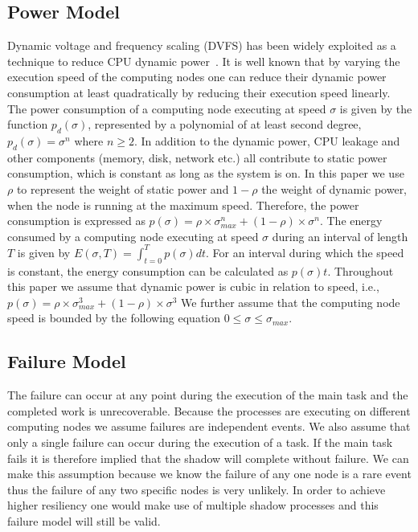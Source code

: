 \subsection{Power Model}
\label{power_model}
Dynamic voltage and frequency scaling
(DVFS) has
been widely exploited as a technique to reduce CPU dynamic power~\cite{flautner_2002_APS,pillai_2001_sosp}.
It is well known that by varying the execution speed of the computing
nodes one can reduce their dynamic power consumption at least quadratically by
reducing their execution speed linearly. The power consumption of a
computing node executing at speed $\sigma$ is given by the function
$p_d(\sigma)$, represented by a polynomial of at least second degree,
$p_d(\sigma)=\sigma^n$ where $n\geq2$. 
In addition to the dynamic power, CPU leakage and other components
(memory, disk, network etc.) all contribute to static power
consumption, which is constant as long as the system is on. In this paper we
use $\rho$ to represent the weight of static power and $1-\rho$ the weight 
of dynamic power, when the node is running at the maximum speed.
Therefore, the power consumption is expressed as $p(\sigma)=\rho \times \sigma_{max}^n + (1-\rho)\times \sigma^n$.
The energy consumed by a
computing node executing at speed $\sigma$ during an interval of
length $T$ is given by $E(\sigma,T)=\int_{t=0}^T
p(\sigma)dt$. For an interval during which the speed is constant, the 
energy consumption can be calculated as $p(\sigma)t$. Throughout this paper
we assume that dynamic power is cubic in relation to speed, i.e., 
$p(\sigma)=\rho \times \sigma_{max}^3 + (1-\rho)\times \sigma^3$
We further assume that the computing node speed is bounded by the
following equation $0\leq\sigma\leq\sigma_{max}$.

\subsection{Failure Model}
\label{failure_model}

The failure can occur at any point during the execution of the main
task and the completed work is unrecoverable. Because the processes
are executing on different computing nodes we assume failures are
independent events. We also assume that only a single failure can
occur during the execution of a task. If the main task fails it is
therefore implied that the shadow will complete without failure. We
can make this assumption because we know the failure of any one node
is a rare event thus the failure of any two specific nodes is very
unlikely. In order to achieve higher resiliency one
would make use of multiple shadow processes and this failure model
will still be valid.


